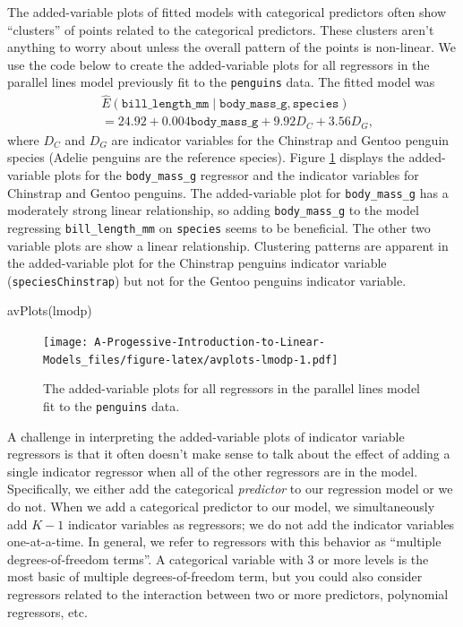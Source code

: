 \documentclass[
]{book}
\newenvironment{Shaded}{\begin{snugshade}}{\end{snugshade}}
\newcommand{\FunctionTok}[1]{\textcolor[rgb]{0.00,0.00,0.00}{#1}}
\newcommand{\NormalTok}[1]{#1}
\theoremstyle{definition}
\theoremstyle{definition}
\theoremstyle{definition}
\theoremstyle{definition}
\theoremstyle{remark}
\begin{document}
The added-variable plots of fitted models with categorical predictors
often show ``clusters'' of points related to the categorical predictors.
These clusters aren't anything to worry about unless the overall pattern
of the points is non-linear. We use the code below to create the
added-variable plots for all regressors in the parallel lines model
previously fit to the \texttt{penguins} data. The fitted model was \[
\begin{aligned}
&\hat{E}(\mathtt{bill\_length\_mm} \mid \mathtt{body\_mass\_g}, \mathtt{species})\\
&= 24.92 + 0.004 \mathtt{body\_mass\_g} + 9.92 D_C + 3.56 D_G,
\end{aligned}
\] where \(D_C\) and \(D_G\) are indicator variables for the Chinstrap and
Gentoo penguin species (Adelie penguins are the reference species).
Figure \ref{fig:avplots-lmodp} displays the added-variable plots for
the \texttt{body\_mass\_g} regressor and the indicator variables for Chinstrap
and Gentoo penguins. The added-variable plot for \texttt{body\_mass\_g} has a
moderately strong linear relationship, so adding \texttt{body\_mass\_g} to the
model regressing \texttt{bill\_length\_mm} on \texttt{species} seems to be beneficial.
The other two variable plots are show a linear relationship. Clustering
patterns are apparent in the added-variable plot for the Chinstrap
penguins indicator variable (\texttt{speciesChinstrap}) but not for the Gentoo
penguins indicator variable.

\begin{Shaded}
\begin{Highlighting}[]
\FunctionTok{avPlots}\NormalTok{(lmodp)}
\end{Highlighting}
\end{Shaded}

\begin{figure}
\centering
\texttt{[image: A-Progessive-Introduction-to-Linear-Models\_files/figure-latex/avplots-lmodp-1.pdf]}
\caption{\label{fig:avplots-lmodp}The added-variable plots for all regressors in the parallel lines model fit to the \texttt{penguins} data.}
\end{figure}

A challenge in interpreting the added-variable plots of indicator
variable regressors is that it often doesn't make sense to talk about
the effect of adding a single indicator regressor when all of the other
regressors are in the model. Specifically, we either add the categorical
\emph{predictor} to our regression model or we do not. When we add a
categorical predictor to our model, we simultaneously add \(K-1\)
indicator variables as regressors; we do not add the indicator variables
one-at-a-time. In general, we refer to regressors with this behavior as
``multiple degrees-of-freedom terms''. A categorical variable with 3 or
more levels is the most basic of multiple degrees-of-freedom term, but
you could also consider regressors related to the interaction between
two or more predictors, polynomial regressors, etc.
\end{document}
